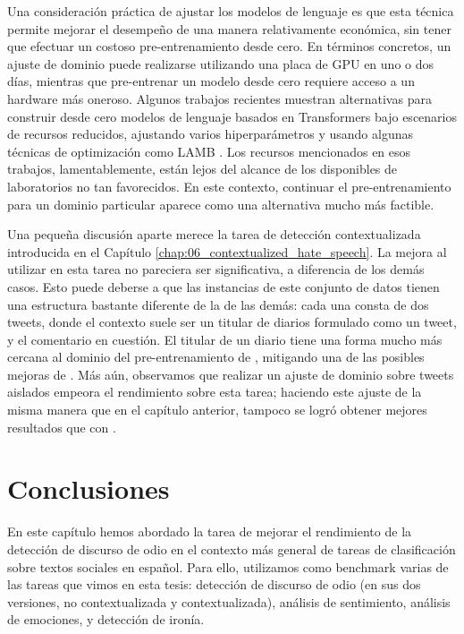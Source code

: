 Una consideración práctica de ajustar los modelos de lenguaje es que esta técnica permite mejorar el desempeño de una manera relativamente económica, sin tener que efectuar un costoso pre-entrenamiento desde cero. En términos concretos, un ajuste de dominio puede realizarse utilizando una placa de GPU en uno o dos días, mientras que pre-entrenar un modelo desde cero requiere acceso a un hardware más oneroso. Algunos trabajos recientes \cite{izsak2021train} muestran alternativas para construir desde cero modelos de lenguaje basados en Transformers bajo escenarios de recursos reducidos, ajustando varios hiperparámetros y usando algunas técnicas de optimización como LAMB \cite{you2019large}. Los recursos mencionados en esos trabajos, lamentablemente, están lejos del alcance de los disponibles de laboratorios no tan favorecidos. En este contexto, continuar el pre-entrenamiento para un dominio particular aparece como una alternativa mucho más factible.

Una pequeña discusión aparte merece la tarea de detección contextualizada introducida en el Capítulo \ref{chap:06_contextualized_hate_speech}. La mejora al utilizar \robertuito{} en esta tarea no pareciera ser significativa, a diferencia de los demás casos. Esto puede deberse a que las instancias de este conjunto de datos tienen una estructura bastante diferente de la de las demás: cada una consta de dos tweets, donde el contexto suele ser un titular de diarios formulado como un tweet, y el comentario en cuestión. El titular de un diario tiene una forma mucho más cercana al dominio del pre-entrenamiento de \beto{}, mitigando una de las posibles mejoras de \robertuito{}. Más aún, observamos que realizar un ajuste de dominio sobre tweets aislados empeora el rendimiento sobre esta tarea; haciendo este ajuste de la misma manera que en el capítulo anterior, tampoco se logró obtener mejores resultados que con \beto{}.


\section{Conclusiones}

En este capítulo hemos abordado la tarea de mejorar el rendimiento de la detección de discurso de odio en el contexto más general de tareas de clasificación sobre textos sociales en español. Para ello, utilizamos como benchmark varias de las tareas que vimos en esta tesis: detección de discurso de odio (en sus dos versiones, no contextualizada y contextualizada), análisis de sentimiento, análisis de emociones, y detección de ironía.

